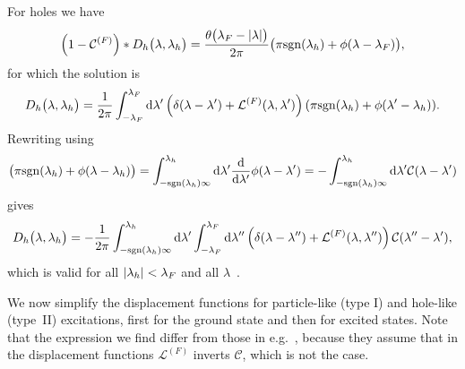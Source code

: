 \documentclass[11pt, a4paper]{report} %
\begin{document}
For holes we have 
\begin{align}
  \label{eq:37}
  \qty(1-\mathcal{C}^{(F)})* D_h\qty\big(\lambda,\lambda_h) = \frac{\theta\qty\big(\lambda_F-\abs{\lambda})}{2\pi} \qty\big(\pi\mathrm{sgn}\qty(\lambda_h) + \phi\qty(\lambda-\lambda_F)),
\end{align}
for which the solution is 
\begin{align}
  \label{eq:38}
  D_h\qty\big(\lambda,\lambda_h) = \frac{1}{2\pi} \int_{-\lambda_F}^{\lambda_F} \dd \lambda' \left(\delta\qty(\lambda-\lambda')+\mathcal{L}^{(F)}\qty(\lambda,\lambda')\right)\qty(\pi\mathrm{sgn}\qty(\lambda_h) + \phi\qty(\lambda'-\lambda_h)).
\end{align}
Rewriting using
\begin{align}
  \label{eq:39}
   \qty\big(\pi \mathrm{sgn}(\lambda_h) + \phi(\lambda-\lambda_h)) = \int_{-\mathrm{sgn}\qty(\lambda_h)\infty}^{\lambda_h} \dd \lambda' \frac{\dd}{\dd\lambda'} \phi\qty(\lambda - \lambda') 
                                                                         = -  \int_{-\mathrm{sgn}\qty(\lambda_h)\infty}^{\lambda_h} \dd \lambda' \mathcal{C}\qty(\lambda-\lambda')
\end{align}
gives
\begin{align}
  \label{eq:40}
  D_h\qty\big(\lambda, \lambda_h) = - \frac{1}{2\pi} \int_{-\textrm{sgn}(\lambda_h)\infty}^{\lambda_h} \dd \lambda' \int_{-\lambda_F}^{\lambda_F} \dd \lambda'' \left(\delta\qty(\lambda-\lambda'') + \mathcal{L}^{(F)}\qty(\lambda,\lambda'') \right)\mathcal{C}\qty(\lambda''-\lambda'),
\end{align}
which is valid for all \(\abs{\lambda_h}<\lambda_F\) and all \(\lambda\)~\cite{Caux2015}.

We now simplify the displacement functions for particle-like (type I) and hole-like (type~II) excitations, first for the ground state and then for excited states.
Note that the expression we find differ from those in e.g.~\cite{Korepin1993}, because they assume that in the displacement functions \(\mathcal{L}^{(F)}\) inverts \(\mathcal{C}\), which is not the case.
\end{document}
